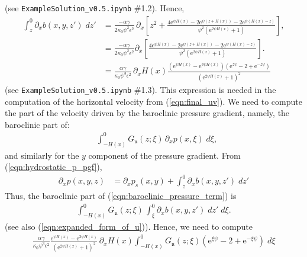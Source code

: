\documentclass[10pt]{amsart}
\begin{document}
 (see \texttt{ExampleSolution\_v0.5.ipynb} \#1.2).
 Hence,
 \begin{align}
 \int_{z}^{0} \partial_x b(x,y,z') \; dz' & = 
 \frac{- \alpha  \gamma}{2 \kappa_0  \psi^{2} \epsilon^{2}} \,  \partial_x
 \left[
 z^2 + \frac{ 4 \mathrm{e}^{ \psi  H(x)} 
- 2 \mathrm{e}^{ \psi \left(  z + H(x) \right)} 
- 2 \mathrm{e}^{ \psi \left(  H(x) - z \right)} }{  \psi^{2}  \left( \mathrm{e}^{2  \psi H(x)} + 1 \right)}  
 \right] , \nonumber 
 \\
 & =
 \frac{- \alpha  \gamma}{ 2 \kappa_0  \psi^{2} \epsilon^{2}} \partial_x \left[
 \frac{ 4 \mathrm{e}^{ \psi  H(x)} 
- 2 \mathrm{e}^{ \psi \left(  z + H(x) \right)} 
- 2 \mathrm{e}^{ \psi \left(  H(x) - z \right)} }{  \psi^{2}  \left( \mathrm{e}^{2  \psi H(x)} + 1 \right)} 
\right] . \nonumber \\
& =
 \frac{\alpha  \gamma}{ \kappa_0  \psi^{3} \epsilon^{2}} \, \partial_x H(x) 
 \frac{ \left( \mathrm{e}^{\psi H(x)}  - \mathrm{e}^{3 \psi H(x)}  \right)  \left( \mathrm{e}^{z \psi} - 2 + \mathrm{e}^{ - z \psi} \right) }{\left( \mathrm{e}^{2 \psi H(x)} + 1 \right)^{2}} 
\label{eqn:vert_int_b_gradient}
\end{align}
(see \texttt{ExampleSolution\_v0.5.ipynb} \#1.3).
This expression is needed in the computation of the horizontal velocity from (\ref{eqn:final_uv}). 
We need to compute the part of the velocity driven by the baroclinic pressure gradient, namely, the baroclinic part of:
 \begin{align}
&\int_{-H(x)}^{0} G_{ \mathfrak{u}} (z; \xi) \, \partial_x p( x, \xi)  \; d \xi ,
\label{eqn:baroclinic_pressure_term}
\end{align}
and similarly for the $y$ component of the pressure gradient.
From (\ref{eqn:hydrostatic_p_pgf}),
\begin{align}
\partial_x p(x,y,z) & = \partial_x p_s (x, y) + \int_{z}^{0} \partial_x b(x,y,z') \; dz' 
\nonumber
\end{align}
Thus, the baroclinic part of (\ref{eqn:baroclinic_pressure_term}) is
\begin{align}
\int_{-H(x)}^{0} G_{ \mathfrak{u}} (z; \xi) \, \int_{\xi}^{0} \partial_x b(x,y,z') \; dz'   \; d \xi .
\nonumber
\end{align}
(see also (\ref{eqn:expanded_form_of_u})).
Hence, we need to compute
\begin{align}
\frac{ \alpha  \gamma }{\kappa_0  \psi^{3} \epsilon^{2}} 
\frac{ \mathrm{e}^{\psi H(x)}  -  \mathrm{e}^{3 \psi H(x)} }{\left( \mathrm{e}^{2 \psi H(x)} + 1 \right)^{2}} 
 \, \partial_x H(x) 
\int_{-H(x)}^{0} G_{ \mathfrak{u}} (z; \xi) 
\left( \mathrm{e}^{\xi \psi} - 2 + \mathrm{e}^{ - \xi \psi} \right)
\; d \xi \nonumber
\end{align}
\end{document}
